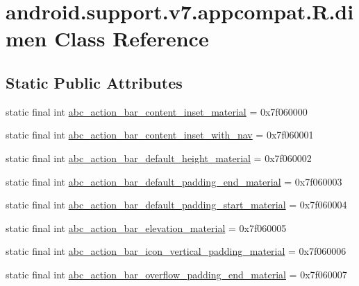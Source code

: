 \hypertarget{classandroid_1_1support_1_1v7_1_1appcompat_1_1_r_1_1dimen}{}\section{android.\+support.\+v7.\+appcompat.\+R.\+dimen Class Reference}
\label{classandroid_1_1support_1_1v7_1_1appcompat_1_1_r_1_1dimen}
\subsection*{Static Public Attributes}
\begin{DoxyCompactItemize}
\item 
static final int \mbox{\hyperlink{classandroid_1_1support_1_1v7_1_1appcompat_1_1_r_1_1dimen_a16b8f74d21224eeb5be3d887e9419862}{abc\+\_\+action\+\_\+bar\+\_\+content\+\_\+inset\+\_\+material}} = 0x7f060000
\item 
static final int \mbox{\hyperlink{classandroid_1_1support_1_1v7_1_1appcompat_1_1_r_1_1dimen_a2a781b8c00eb2a75ab45622051168a8e}{abc\+\_\+action\+\_\+bar\+\_\+content\+\_\+inset\+\_\+with\+\_\+nav}} = 0x7f060001
\item 
static final int \mbox{\hyperlink{classandroid_1_1support_1_1v7_1_1appcompat_1_1_r_1_1dimen_a8ce0c5f4f00b5744f6403f67c48cb4da}{abc\+\_\+action\+\_\+bar\+\_\+default\+\_\+height\+\_\+material}} = 0x7f060002
\item 
static final int \mbox{\hyperlink{classandroid_1_1support_1_1v7_1_1appcompat_1_1_r_1_1dimen_a067da9abef12ba2f906b6080a5a912d0}{abc\+\_\+action\+\_\+bar\+\_\+default\+\_\+padding\+\_\+end\+\_\+material}} = 0x7f060003
\item 
static final int \mbox{\hyperlink{classandroid_1_1support_1_1v7_1_1appcompat_1_1_r_1_1dimen_a993d714aa584cfe3ef4b3f91fd062aa2}{abc\+\_\+action\+\_\+bar\+\_\+default\+\_\+padding\+\_\+start\+\_\+material}} = 0x7f060004
\item 
static final int \mbox{\hyperlink{classandroid_1_1support_1_1v7_1_1appcompat_1_1_r_1_1dimen_a859b78388dcdd04d0b3375283c0a5a0b}{abc\+\_\+action\+\_\+bar\+\_\+elevation\+\_\+material}} = 0x7f060005
\item 
static final int \mbox{\hyperlink{classandroid_1_1support_1_1v7_1_1appcompat_1_1_r_1_1dimen_a4e148bb5abc8982092986153140c5645}{abc\+\_\+action\+\_\+bar\+\_\+icon\+\_\+vertical\+\_\+padding\+\_\+material}} = 0x7f060006
\item 
static final int \mbox{\hyperlink{classandroid_1_1support_1_1v7_1_1appcompat_1_1_r_1_1dimen_a5a92c209ad6132c4236653fc2bef6f45}{abc\+\_\+action\+\_\+bar\+\_\+overflow\+\_\+padding\+\_\+end\+\_\+material}} = 0x7f060007

\end{DoxyCompactItemize}
